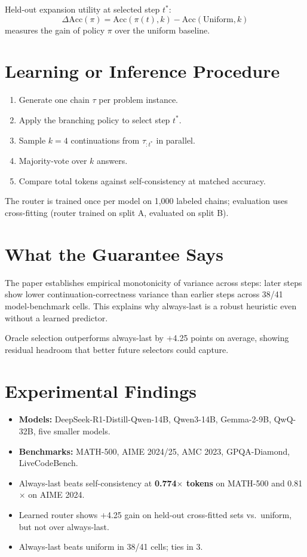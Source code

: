 \documentclass[10pt,twocolumn]{article}
\begin{document}
Held-out expansion utility at selected step $t^*$:
\[
\Delta\mathrm{Acc}(\pi) = \mathrm{Acc}(\pi(t), k) - \mathrm{Acc}(\mathrm{Uniform}, k)
\]
measures the gain of policy $\pi$ over the uniform baseline.

\section{Learning or Inference Procedure}

\begin{enumerate}[itemsep=2pt,parsep=0pt]
  \item Generate one chain $\tau$ per problem instance.
  \item Apply the branching policy to select step $t^*$.
  \item Sample $k{=}4$ continuations from $\tau_{:t^*}$ in parallel.
  \item Majority-vote over $k$ answers.
  \item Compare total tokens against self-consistency at matched accuracy.
\end{enumerate}

The router is trained once per model on 1,000 labeled chains; evaluation
uses cross-fitting (router trained on split A, evaluated on split B).

\section{What the Guarantee Says}

The paper establishes empirical monotonicity of variance across steps: later
steps show lower continuation-correctness variance than earlier steps across
38/41 model-benchmark cells. This explains why always-last is a robust heuristic
even without a learned predictor.

Oracle selection outperforms always-last by $+$4.25 points on average, showing
residual headroom that better future selectors could capture.

\section{Experimental Findings}

\begin{itemize}[itemsep=2pt,parsep=0pt]
  \item \textbf{Models:} DeepSeek-R1-Distill-Qwen-14B, Qwen3-14B, Gemma-2-9B,
    QwQ-32B, five smaller models.
  \item \textbf{Benchmarks:} MATH-500, AIME 2024/25, AMC 2023, GPQA-Diamond,
    LiveCodeBench.
  \item Always-last beats self-consistency at \textbf{0.774$\times$ tokens}
    on MATH-500 and 0.81$\times$ on AIME 2024.
  \item Learned router shows $+$4.25 gain on held-out cross-fitted sets vs.\
    uniform, but not over always-last.
  \item Always-last beats uniform in 38/41 cells; ties in 3.
\end{itemize}
\end{document}
